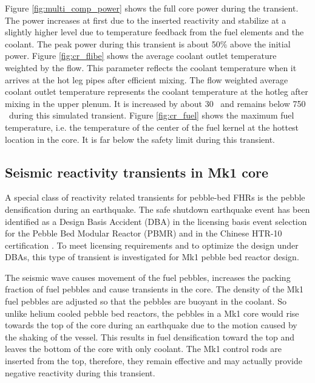 \documentclass{elsarticle}
\begin{document}
Figure \ref{fig:multi_comp_power} shows the full core power during the transient. The power increases at first due to the inserted reactivity and stabilize at a slightly higher level due to temperature feedback from the fuel elements and the coolant. The peak power during this transient is about 50\% above the initial power. 
Figure \ref{fig:cr_flibe} shows the average coolant outlet temperature weighted by the flow. This parameter reflects the coolant temperature when it arrives at the hot leg pipes after efficient mixing. 
The flow weighted average coolant outlet temperature represents the coolant temperature at the hotleg after mixing in the upper plenum. It is increased by about 30 \degc\  and remains below 750 \degc\ during this simulated transient.
Figure \ref{fig:cr_fuel} shows the maximum fuel temperature, i.e. the temperature of the center of the fuel kernel at the hottest location in the core. It is far below the safety limit during this transient.











\subsection{Seismic reactivity transients in Mk1 core}
A special class of reactivity related transients for pebble-bed FHRs is the pebble densification during an earthquake. 
The safe shutdown earthquake event has been identified as a Design Basis Accident (DBA) in the licensing basis event selection for the Pebble Bed Modular Reactor (PBMR) and in the Chinese HTR-10 certification \cite{Reitsma2012}. 
To meet licensing requirements and to optimize the design under DBAs, this type of transient is investigated for Mk1 pebble bed reactor design.

The seismic wave causes movement of the fuel pebbles, increases the packing fraction of fuel pebbles and cause transients in the core. 
The density of the Mk1 fuel pebbles are adjusted so that the pebbles are buoyant in the coolant. So unlike helium cooled pebble bed reactors, the pebbles in a Mk1 core would rise towards the top of the core during an earthquake due to the motion caused by the shaking of the vessel. This results in fuel densification toward the top and leaves the bottom of the core with only coolant.
The Mk1 control rods are inserted from the top, therefore, they remain effective and may actually provide negative reactivity during this transient.
\end{document}
